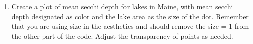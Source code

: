 \documentclass[]{article}
\newenvironment{Shaded}{\begin{snugshade}}{\end{snugshade}}
\newcommand{\CommentTok}[1]{\textcolor[rgb]{0.56,0.35,0.01}{\textit{#1}}}
\newcommand{\DataTypeTok}[1]{\textcolor[rgb]{0.13,0.29,0.53}{#1}}
\newcommand{\KeywordTok}[1]{\textcolor[rgb]{0.13,0.29,0.53}{\textbf{#1}}}
\newcommand{\NormalTok}[1]{#1}
\newcommand{\OperatorTok}[1]{\textcolor[rgb]{0.81,0.36,0.00}{\textbf{#1}}}
\newcommand{\StringTok}[1]{\textcolor[rgb]{0.31,0.60,0.02}{#1}}
\providecommand{\tightlist}{%
  \setlength{\itemsep}{0pt}\setlength{\parskip}{0pt}}
\begin{document}
\begin{Shaded}
\end{Shaded}

\begin{enumerate}
\def\labelenumi{\arabic{enumi}.}
\setcounter{enumi}{5}
\tightlist
\item
  Create a plot of mean secchi depth for lakes in Maine, with mean
  secchi depth designated as color and the lake area as the size of the
  dot. Remember that you are using size in the aesthetics and should
  remove the size = 1 from the other part of the code. Adjust the
  transparency of points as needed.
\end{enumerate}
\end{document}
